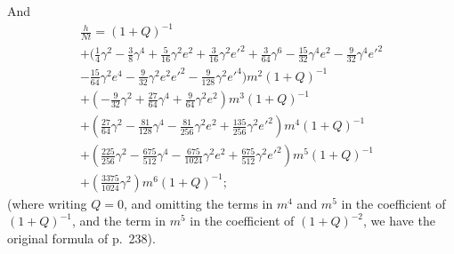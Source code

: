 \documentclass[11pt,a4paper]{article}
\theoremstyle{plain}
\theoremstyle{definition}
\theoremstyle{remark}
\begin{document}
And
\begin{multline*}
\frac{h}{Nt}=(1+Q)^{-1}\\
+(\tfrac14 \gamma^{2} - \tfrac{3}{8}\gamma^{4} + \tfrac{5}{16}\gamma^{2}e^{2} + \tfrac{3}{16}\gamma^{2}e'^{2} + \tfrac{3}{64}\gamma^{6} - \tfrac{15}{32}\gamma^{4}e^{2} - \tfrac{9}{32}\gamma^{4}e'^{2}\\
- \tfrac{15}{64}\gamma^{2}e^{4} - \tfrac{9}{32}\gamma^{2}e^{2}e'^{2} - \tfrac{9}{128}\gamma^{2}e'^{4})m^{2}(1+Q)^{-1}\\
+(-\tfrac{9}{32}\gamma^{2} + \tfrac{27}{64}\gamma^{4} + \tfrac{9}{64}\gamma^{2}e^{2})m^{3}(1+Q)^{-1}\\
+(\tfrac{27}{64}\gamma^{2} - \tfrac{81}{128}\gamma^{4} - \tfrac{81}{256}\gamma^{2}e^{2} + \tfrac{135}{256}\gamma^{2}e'^{2})m^{4}(1+Q)^{-1}\\
+(\tfrac{225}{256}\gamma^{2} - \tfrac{675}{512}\gamma^{4} - \tfrac{675}{1024}\gamma^{2}e^{2} + \tfrac{675}{512}\gamma^{2}e'^{2})m^{5}(1+Q)^{-1}\\
+(\tfrac{3375}{1024}\gamma^{2})m^{6}(1+Q)^{-1};
\end{multline*}
(where writing $Q=0$, and omitting the terms in $m^{4}$ and $m^{5}$ in the coefficient of $(1+Q)^{-1}$, and the term in $m^{5}$ in the coefficient of $(1+Q)^{-2}$, we have the original formula of p.~238).
\end{document}
